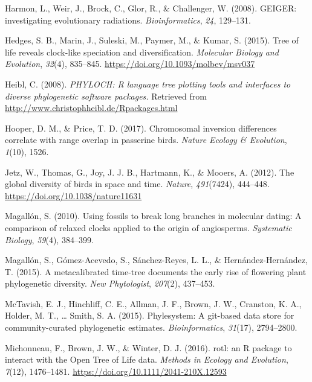 \documentclass[
  english,
  man]{apa6}
\newlength{\cslhangindent}
\newlength{\cslentryspacingunit} %
\newenvironment{CSLReferences}[2] %
 {%
  \setlength{\parindent}{0pt}
  \ifodd #1
  \let\oldpar\par
  \def\par{\hangindent=\cslhangindent\oldpar}
  \fi
  \setlength{\parskip}{#2\cslentryspacingunit}
 }%
 {}
\begin{document}
\begin{CSLReferences}{1}{0}
\leavevmode{}%
Harmon, L., Weir, J., Brock, C., Glor, R., \& Challenger, W. (2008). {GEIGER: investigating evolutionary radiations}. \emph{Bioinformatics}, \emph{24}, 129--131.

\leavevmode{}%
Hedges, S. B., Marin, J., Suleski, M., Paymer, M., \& Kumar, S. (2015). {Tree of life reveals clock-like speciation and diversification}. \emph{Molecular Biology and Evolution}, \emph{32}(4), 835--845. \url{https://doi.org/10.1093/molbev/msv037}

\leavevmode{}%
Heibl, C. (2008). \emph{PHYLOCH: R language tree plotting tools and interfaces to diverse phylogenetic software packages.} Retrieved from \url{http://www.christophheibl.de/Rpackages.html}

\leavevmode{}%
Hooper, D. M., \& Price, T. D. (2017). Chromosomal inversion differences correlate with range overlap in passerine birds. \emph{Nature Ecology \& Evolution}, \emph{1}(10), 1526.

\leavevmode{}%
Jetz, W., Thomas, G., Joy, J. J. B., Hartmann, K., \& Mooers, A. (2012). {The global diversity of birds in space and time}. \emph{Nature}, \emph{491}(7424), 444--448. \url{https://doi.org/10.1038/nature11631}

\leavevmode{}%
Magallón, S. (2010). Using fossils to break long branches in molecular dating: A comparison of relaxed clocks applied to the origin of angiosperms. \emph{Systematic Biology}, \emph{59}(4), 384--399.

\leavevmode{}%
Magallón, S., Gómez-Acevedo, S., Sánchez-Reyes, L. L., \& Hernández-Hernández, T. (2015). A metacalibrated time-tree documents the early rise of flowering plant phylogenetic diversity. \emph{New Phytologist}, \emph{207}(2), 437--453.

\leavevmode{}%
McTavish, E. J., Hinchliff, C. E., Allman, J. F., Brown, J. W., Cranston, K. A., Holder, M. T., \ldots{} Smith, S. A. (2015). Phylesystem: A git-based data store for community-curated phylogenetic estimates. \emph{Bioinformatics}, \emph{31}(17), 2794--2800.

\leavevmode{}%
Michonneau, F., Brown, J. W., \& Winter, D. J. (2016). {rotl: an R package to interact with the Open Tree of Life data}. \emph{Methods in Ecology and Evolution}, \emph{7}(12), 1476--1481. \url{https://doi.org/10.1111/2041-210X.12593}


\end{CSLReferences}
\end{document}
